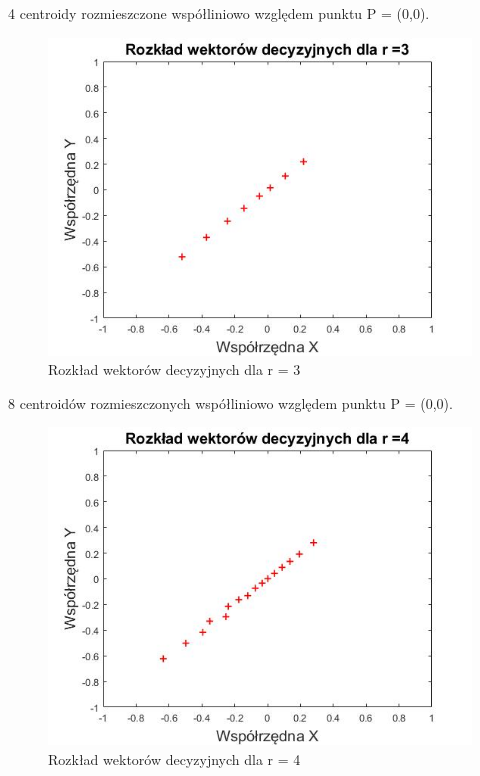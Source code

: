 \documentclass[12pt, a4paper, oneside]{article}
\begin{document}
\begin{center}
4 centroidy rozmieszczone współliniowo względem punktu P = (0,0).
\end{center}
\clearpage
\begin{figure}[h!]
\centering
\caption{Rozkład wektorów decyzyjnych dla r = 3}
\includegraphics[scale=0.65]{pics/f3}
\end{figure}
\begin{center}
8 centroidów rozmieszczonych współliniowo względem punktu P = (0,0).
\end{center}
\begin{figure}[h!]
\centering
\caption{Rozkład wektorów decyzyjnych dla r = 4}
\includegraphics[scale=0.65]{pics/f4}
\end{figure}
\end{document}
